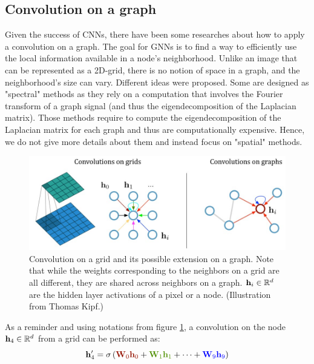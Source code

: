 \documentclass{article}
\begin{document}
    \subsection{Convolution on a graph}
    \label{subsec:convolution-graph}

Given the success of CNNs, there have been some researches about how to apply a convolution on a graph. The goal for GNNs is to find a way to efficiently use the local information available in a node's neighborhood. Unlike an image that can be represented as a 2D-grid, there is no notion of space in a graph, and the neighborhood's size can vary. Different ideas were proposed. Some are designed as "spectral" methods as they rely on a computation that involves the Fourier transform of a graph signal (and thus the eigendecomposition of the Laplacian matrix). Those methods require to compute the eigendecomposition of the Laplacian matrix for each graph and thus are computationally expensive. Hence, we do not give more details about them and instead focus on "spatial" methods.

\begin{figure}
    \centering
    \includegraphics[scale=.6]{images/convolutions_grid_graph.jpg}
    \caption{Convolution on a grid and its possible extension on a graph. Note that while the weights corresponding to the neighbors on a grid are all different, they are shared across neighbors on a graph. $\mathbf{h}_i \in \mathbb{R}^d$ are the hidden layer activations of a pixel or a node. (Illustration from Thomas Kipf.)}
    \label{fig:convolution-grid-graph}
\end{figure}

As a reminder and using notations from figure \ref{fig:convolution-grid-graph}, a convolution on the node $\mathbf{h}_4 \in \mathbb{R}^d$ from a grid can be performed as:
\begin{equation*}
    \hv_4' = \sigma \left( \textcolor[rgb]{0.58, 0.07, 0.00}{\Wm_0 \hv_0} + \textcolor[rgb]{0.31, 0.56, 0.00}{\Wm_1 \hv_1} + \dots +  \textcolor{blue}{\Wm_9 \hv_9} \right)
\end{equation*}
\end{document}
